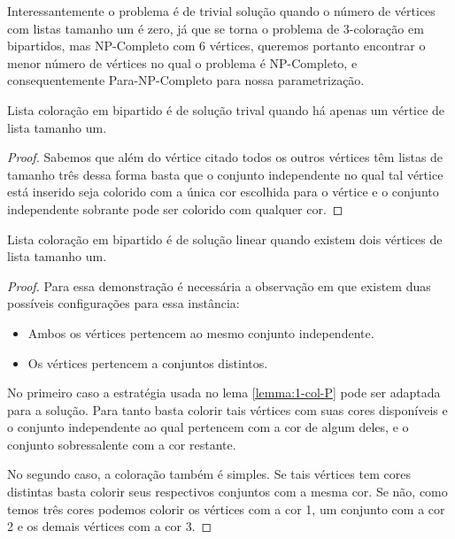 Interessantemente o problema é de trivial solução quando o número de vértices com listas tamanho um é zero, já que se torna o problema de 3-coloração em bipartidos, mas NP-Completo com 6 vértices, queremos portanto encontrar o menor número de vértices no qual o problema é NP-Completo, e consequentemente Para-NP-Completo para nossa parametrização.

\begin{teorema}
\label{lemma:1-col-P}
 Lista coloração em bipartido é de solução trival quando há apenas um vértice de lista tamanho um.
\end{teorema}
\begin{proof}
 Sabemos que além do vértice citado todos os outros vértices têm listas de tamanho três dessa forma basta que o conjunto independente no qual tal vértice está inserido seja colorido com a única cor escolhida para o vértice e o conjunto independente sobrante pode ser colorido com qualquer cor.
\end{proof}

\begin{teorema}
 Lista coloração em bipartido é de solução linear quando existem dois vértices de lista tamanho um.
\end{teorema}
\begin{proof}
 Para essa demonstração é necessária a observação em que existem duas possíveis configurações para essa instância:
 \begin{itemize}
   \item Ambos os vértices pertencem ao mesmo conjunto independente.
   \item Os vértices pertencem a conjuntos distintos.
 \end{itemize} 
 No primeiro caso a estratégia usada no lema \ref{lemma:1-col-P} pode ser adaptada para a solução. Para tanto basta colorir tais vértices com suas cores disponíveis e o conjunto independente ao qual pertencem com a cor de algum deles, e o conjunto sobressalente com a cor restante.
 
 No segundo caso, a coloração também é simples. Se tais vértices tem cores distintas basta colorir seus respectivos conjuntos com a mesma cor. Se não, como temos três cores podemos colorir os vértices com a cor 1, um conjunto com a cor 2 e os demais vértices com a cor 3.  
\end{proof}


